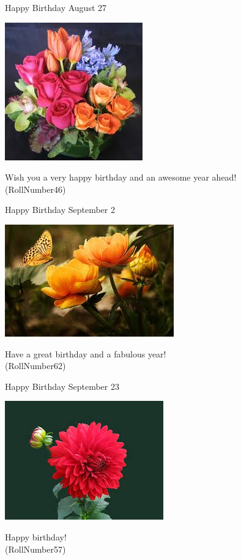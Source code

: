 \documentclass[table, landscape]{beamer}
\begin{document}
\begin{frame}{\color{red}Happy Birthday }
{August 27}
\begin{center}
\includegraphics[height=0.5\textheight]{flowers/f9.jpeg}

Wish you a very happy birthday and an awesome year ahead! \\ \vspace{0.5cm}{\Large name39} (RollNumber46)
\end{center}
\end{frame}
\begin{frame}{\color{blue}Happy Birthday }
{September 2}
\begin{center}
\includegraphics[height=0.5\textheight]{flowers/f7.jpeg}

Have a great birthday and a fabulous year! \\ \vspace{0.5cm}{\Large name55} (RollNumber62)
\end{center}
\end{frame}
\begin{frame}{\color{blue}Happy Birthday }
{September 23}
\begin{center}
\includegraphics[height=0.5\textheight]{flowers/f1.jpeg}

Happy birthday! \\ \vspace{0.5cm}{\Large name50} (RollNumber57)
\end{center}
\end{frame}
\end{document}
